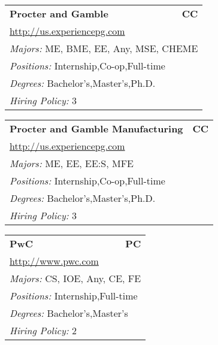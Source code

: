 \documentclass[twoside]{article}
\begin{document}
\begin{center}
\begin{multicols}{3}
\begin{FlushLeft}
\begin{minipage}{.9\columnwidth}
\end{minipage}
 
\begin{minipage}{.9\columnwidth}\begin{tabularx}{.95\columnwidth}{Xr}
                 {\Large\bf Procter and Gamble} & {\Large\bf CC}\\
    \multicolumn{2}{p{.95\columnwidth}}{\url{http://us.experiencepg.com}}\\
    \multicolumn{2}{p{.95\columnwidth}}{\emph{Majors:} ME, BME, EE, Any, MSE, CHEME}\\
    \multicolumn{2}{p{.95\columnwidth}}{\emph{Positions:} Internship,Co-op,Full-time}\\
    \multicolumn{2}{p{.95\columnwidth}}{\emph{Degrees:} Bachelor's,Master's,Ph.D.}\\
    \multicolumn{2}{p{.95\columnwidth}}{\emph{Hiring Policy:} 3}\\
    \end{tabularx}
    
\end{minipage}
 
\begin{minipage}{.9\columnwidth}\begin{tabularx}{.95\columnwidth}{Xr}
                 {\Large\bf Procter and Gamble Manufacturing} & {\Large\bf CC}\\
    \multicolumn{2}{p{.95\columnwidth}}{\url{http://us.experiencepg.com}}\\
    \multicolumn{2}{p{.95\columnwidth}}{\emph{Majors:} ME, EE, EE:S, MFE}\\
    \multicolumn{2}{p{.95\columnwidth}}{\emph{Positions:} Internship,Co-op,Full-time}\\
    \multicolumn{2}{p{.95\columnwidth}}{\emph{Degrees:} Bachelor's,Master's,Ph.D.}\\
    \multicolumn{2}{p{.95\columnwidth}}{\emph{Hiring Policy:} 3}\\
    \end{tabularx}
    
\end{minipage}
 
\begin{minipage}{.9\columnwidth}\begin{tabularx}{.95\columnwidth}{Xr}
                 {\Large\bf PwC} & {\Large\bf PC}\\
    \multicolumn{2}{p{.95\columnwidth}}{\url{http://www.pwc.com}}\\
    \multicolumn{2}{p{.95\columnwidth}}{\emph{Majors:} CS, IOE, Any, CE, FE}\\
    \multicolumn{2}{p{.95\columnwidth}}{\emph{Positions:} Internship,Full-time}\\
    \multicolumn{2}{p{.95\columnwidth}}{\emph{Degrees:} Bachelor's,Master's}\\
    \multicolumn{2}{p{.95\columnwidth}}{\emph{Hiring Policy:} 2}\\
    \end{tabularx}
    

\end{minipage}
\end{FlushLeft}
\end{multicols}
\end{center}
\end{document}
